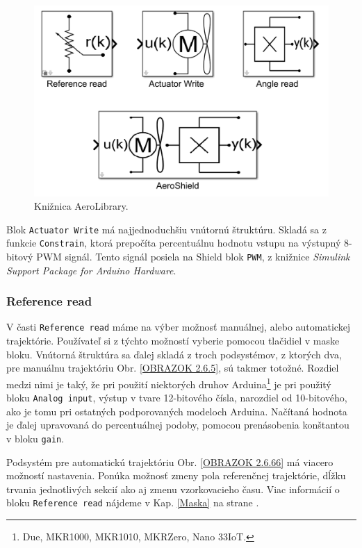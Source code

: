 \begin{figure}[!tbh]
	\centering
	\includegraphics[width=125mm]{obr/AeroLib.png}
	\caption{Knižnica AeroLibrary.}\label{OBRAZOK 2.6.4}
\end{figure}

Blok \verb|Actuator Write| má najjednoduchšiu vnútornú štruktúru. Skladá sa z funkcie \verb*|Constrain|, ktorá prepočíta percentuálnu hodnotu vstupu na výstupný 8-bitový PWM signál. Tento signál posiela na Shield blok \verb*|PWM|, z knižnice \textit{Simulink Support Package for Arduino Hardware}. 

\subsubsection{Reference read}
\label{AngleRead}

V časti \verb|Reference read| máme na výber možnosť manuálnej, alebo automatickej trajektórie. Používateľ si z týchto možností vyberie pomocou tlačidiel v maske bloku. Vnútorná štruktúra sa ďalej skladá z troch podsystémov, z ktorých dva, pre manuálnu trajektóriu Obr. \ref{OBRAZOK 2.6.5}, sú takmer totožné. Rozdiel medzi nimi je taký, že pri použití niektorých druhov Arduina\footnote[8]{Due, MKR1000, MKR1010, MKRZero, Nano 33IoT.} je pri použitý bloku \verb|Analog input|, výstup v tvare 12-bitového čísla, narozdiel od 10-bitového, ako je tomu pri ostatných podporovaných modeloch Arduina. Načítaná hodnota je ďalej upravovaná do percentuálnej podoby, pomocou prenásobenia konštantou v bloku \verb*|gain|. 

Podsystém pre automatickú trajektóriu Obr. \ref{OBRAZOK 2.6.66} má viacero možností nastavenia. Ponúka možnosť zmeny pola referenčnej trajektórie, dĺžku trvania jednotlivých sekcií ako aj zmenu vzorkovacieho času. Viac informácií o bloku \verb|Reference read| nájdeme v Kap. \ref{Maska} na strane \pageref{Maska}. 


